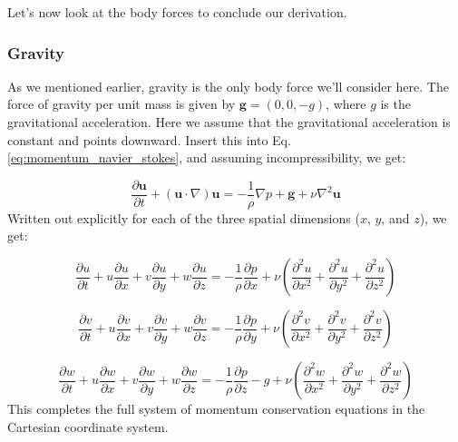 \documentclass[12pt]{article}
\numberwithin{equation}{section}
\numberwithin{figure}{section}
\numberwithin{table}{section}
\begin{document}
Let's now look at the body forces to conclude our derivation.

\subsubsection{Gravity}

As we mentioned earlier, gravity is the only body force we'll consider here.
The force of gravity per unit mass is given by $\mathbf{g} = (0, 0, -g)$,
where $g$ is the gravitational acceleration.
Here we assume that the gravitational acceleration is constant and points downward.
Insert this into Eq. \ref{eq:momentum_navier_stokes}, and assuming
incompressibility, we get:

\begin{equation}
  \frac{\partial \mathbf{u}}{\partial t} + (\mathbf{u} \cdot \nabla) \mathbf{u} =
  - \frac{1}{\rho} \nabla p + \mathbf{g} + \nu \nabla^2 \mathbf{u}
\end{equation}
Written out explicitly for each of the three spatial dimensions ($x$, $y$, and $z$),
we get:

\begin{equation}
  \frac{\partial u}{\partial t} + 
  u \frac{\partial u}{\partial x} + 
  v \frac{\partial u}{\partial y} + 
  w \frac{\partial u}{\partial z} = 
  - \frac{1}{\rho} \frac{\partial p}{\partial x} + \nu \left( \frac{\partial^2 u}{\partial x^2} + \frac{\partial^2 u}{\partial y^2} + \frac{\partial^2 u}{\partial z^2} \right)
\end{equation}

\begin{equation}
  \frac{\partial v}{\partial t} + 
  u \frac{\partial v}{\partial x} + 
  v \frac{\partial v}{\partial y} + 
  w \frac{\partial v}{\partial z} = 
  - \frac{1}{\rho} \frac{\partial p}{\partial y} + \nu \left( \frac{\partial^2 v}{\partial x^2} + \frac{\partial^2 v}{\partial y^2} + \frac{\partial^2 v}{\partial z^2} \right)
\end{equation}

\begin{equation}
  \frac{\partial w}{\partial t} + 
  u \frac{\partial w}{\partial x} + 
  v \frac{\partial w}{\partial y} + 
  w \frac{\partial w}{\partial z} = 
  - \frac{1}{\rho} \frac{\partial p}{\partial z} - g + \nu \left( \frac{\partial^2 w}{\partial x^2} + \frac{\partial^2 w}{\partial y^2} + \frac{\partial^2 w}{\partial z^2} \right)
  \label{eq:momentum_navier_stokes_scalar_w}
\end{equation}
This completes the full system of momentum conservation equations in the
Cartesian coordinate system.
\end{document}
